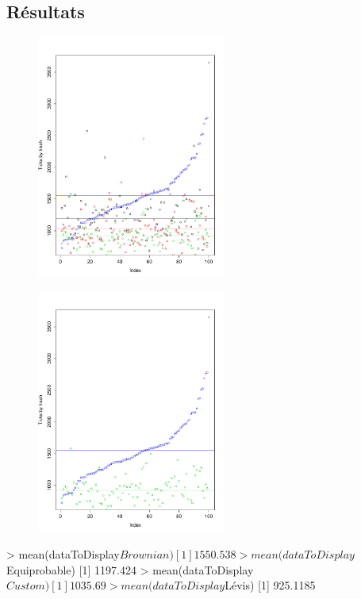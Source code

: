 \subsection{Résultats}

\begin{figure}[H]
	\begin{center}
		\includegraphics[height=8cm]{diagrams/100TrRnd_all.pdf}
		\caption{}
		\label{fig:}
	\end{center}
\end{figure}


\begin{figure}[H]
	\begin{center}
		\includegraphics[height=8cm]{diagrams/100TrRnd_brow_levis.pdf}
		\caption{}
		\label{fig:}
	\end{center}
\end{figure}

> mean(dataToDisplay$Brownian)
[1] 1550.538
> mean(dataToDisplay$Equiprobable)
[1] 1197.424
> mean(dataToDisplay$Custom)
[1] 1035.69
> mean(dataToDisplay$Lévis)
[1] 925.1185